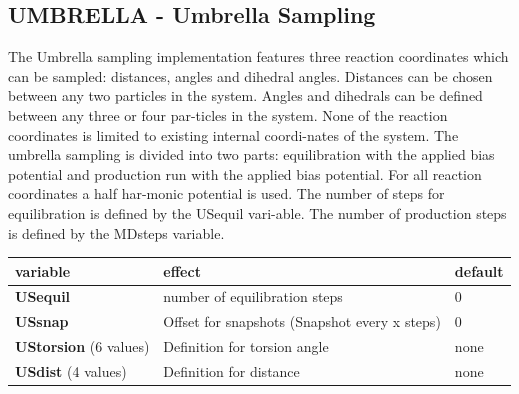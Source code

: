\documentclass[10pt,a4paper]{article} %
\newif\ifverbose %
\newif\ifdevmode %
\begin{document}
{	\ifverbose
	Note: The settings for MDheat can be applied multiple times. The first number indicates the snapshot number, the second one the desired temperature at this snapshot. During the heat-ing process the thermostat is disabled and a simple velocity scaling is used to heat the sys-tem. If the MDheat keyword is applied multiple times heating and cooling can be applied sequentially during a single simulation. The program reads the MDheat keywords from top to bottom and starting with the one and top and finishing with the one on the bottom:\\~\\
	\begin{lstlisting}
	MDheat			    0  	  0.0
	MDheat 			 1000   300.0
	MDheat			 5000   300.0
	MDheat			10000     0.0
	\end{lstlisting}~\\~\\
	In the above example the simulation starts at 0 Kelvin and is heated to 300K within the first 1000 steps. The temperature is kept for 4000 steps until 5000 steps are reached. After that the system is cooled back to 0 Kelvin during steps 5000 to 10000. The user has to take care that enough total steps are performed for the temperature scaling sequence!
	\ifdevmode The settings for spherical boundary conditions are further discussed in section \colorbox{red}{XX}. \fi
	\fi

	\subsection{UMBRELLA - Umbrella Sampling}
	The Umbrella sampling implementation features three reaction coordinates which can be sampled: distances, angles and dihedral angles. Distances can be chosen between any two particles in the system. Angles and dihedrals can be defined between any three or four par-ticles in the system. None of the reaction coordinates is limited to existing internal coordi-nates of the system.
	The umbrella sampling is divided into two parts: equilibration with the applied bias potential and production run with the applied bias potential. For all reaction coordinates a half har-monic potential is used. The number of steps for equilibration is defined by the USequil vari-able. The number of production steps is defined by the MDsteps variable.

	\begin{tabularx}{\textwidth}{l|X|X}
		variable & effect & default \\
		\hline
		\textbf{USequil} & number of equilibration steps & 0 \\
		\textbf{USsnap} & Offset for snapshots (Snapshot every x steps) & 0 \\
		\textbf{UStorsion} (6 values) & Definition for torsion angle & none \\
		\textbf{USdist} (4 values) & Definition for distance & none \\
	\end{tabularx}

}
\end{document}
